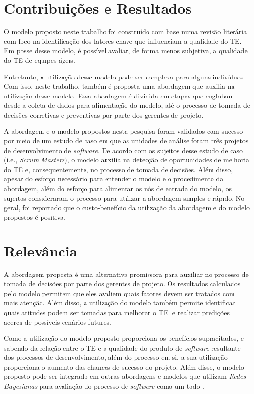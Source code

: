 \section{Contribuições e Resultados}
\label{introducao:resultados}

O modelo proposto neste trabalho foi construído com base numa revisão literária com foco na identificação dos fatores-chave que influenciam a qualidade do TE. Em posse desse modelo, é possível avaliar, de forma menos subjetiva, a qualidade do TE de equipes ágeis.

Entretanto, a utilização desse modelo pode ser complexa para alguns indivíduos. Com isso, neste trabalho, também é proposta uma abordagem que auxilia na utilização desse modelo. Essa abordagem é dividida em etapas que englobam desde a coleta de dados para alimentação do modelo, até o processo de tomada de decisões corretivas e preventivas por parte dos gerentes de projeto.

A abordagem e o modelo propostos nesta pesquisa foram validados com sucesso por meio de um estudo de caso em que as unidades de análise foram três projetos de desenvolvimento de \textit{software}. De acordo com os sujeitos desse estudo de caso (i.e., \textit{Scrum Masters}), o modelo auxilia na detecção de oportunidades de melhoria do TE e, consequentemente, no processo de tomada de decisões. Além disso, apesar do esforço necessário para entender o modelo e o procedimento da abordagem, além do esforço para alimentar os nós de entrada do modelo, os sujeitos consideraram o processo para utilizar a abordagem simples e rápido. No geral, foi reportado que o custo-benefício da utilização da abordagem e do modelo propostos é positiva.

\section{Relevância}
\label{introducao:relevancia}

A abordagem proposta é uma alternativa promissora para auxiliar no processo de tomada de decisões por parte dos gerentes de projeto. Os resultados calculados pelo modelo permitem que eles avaliem quais fatores devem ser tratados com mais atenção. Além disso, a utilização do modelo também permite identificar quais atitudes podem ser tomadas para melhorar o TE, e realizar predições acerca de possíveis cenários futuros.

Como a utilização do modelo proposto proporciona os benefícios supracitados, e sabendo da relação entre o TE e a qualidade do produto de \textit{software} resultante dos processos de desenvolvimento, além do processo em si, a sua utilização proporciona o aumento das chances de sucesso do projeto. Além disso, o modelo proposto pode ser integrado em outras abordagens e modelos que utilizam \textit{Redes Bayesianas} para avaliação do processo de \textit{software} como um todo \cite{perkusich2014} \cite{perkusich2013}.

